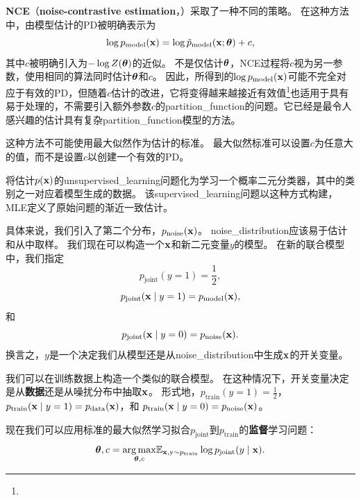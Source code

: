\textbf{\gls{NCE}}（\textbf{noise-contrastive estimation}，）\citep{Gutmann+Hyvarinen-2010}采取了一种不同的策略。
 在这种方法中，由模型估计的\gls{PD}被明确表示为
\begin{equation}
	\log p_{\text{model}} (\mathbf{x}) = \log \tilde{p}_{\text{model}} (\mathbf{x}; \boldsymbol{\theta}) + c,
\end{equation}
其中$c$被明确引入为$-\log Z(\boldsymbol{\theta})$的近似。
不是仅估计$\boldsymbol{\theta}$，\gls{NCE}过程将$c$视为另一参数，使用相同的算法同时估计$\boldsymbol{\theta}$和$c$。
因此，所得到的$\log p_{\text{model}}(\mathbf{x})$可能不完全对应于有效的\gls{PD}，但随着$c$估计的改进，它将变得越来越接近有效值\footnote{}也适用于具有易于处理的，不需要引入额外参数$c$的\gls{partition_function}的问题。它已经是最令人感兴趣的估计具有复杂\gls{partition_function}模型的方法。


这种方法不可能使用最大似然作为估计的标准。
最大似然标准可以设置$c$为任意大的值，而不是设置$c$以创建一个有效的\gls{PD}。


将估计$p(\mathbf{x})$的\gls{unsupervised_learning}问题化为学习一个概率二元分类器，其中的类别之一对应着模型生成的数据。
该\gls{supervised_learning}问题以这种方式构建，\gls{MLE}定义了原始问题的渐近一致估计。


具体来说，我们引入了第二个分布，$p_{\text{noise}}(\mathbf{x})$。
\gls{noise_distribution}应该易于估计和从中取样。
我们现在可以构造一个$\mathbf{x}$和新二元变量$y$的模型。
在新的联合模型中，我们指定
\begin{equation}
	p_{\text{joint}} (y = 1) = \frac{1}{2},
\end{equation}
\begin{equation}
	p_{\text{joint}} (\mathbf{x} \mid y = 1) = p_{\text{model}} (\mathbf{x}),
\end{equation}
和
\begin{equation}
	p_{\text{joint}} (\mathbf{x} \mid y = 0) = p_{\text{noise}}(\mathbf{x}).
\end{equation}
换言之，$y$是一个决定我们从模型还是从\gls{noise_distribution}中生成$\mathbf{x}$的开关变量。


我们可以在训练数据上构造一个类似的联合模型。
在这种情况下，开关变量决定是从\textbf{数据}还是从噪扰分布中抽取$\mathbf{x}$。
形式地，$p_{\text{train}}(y = 1) = \frac{1}{2}$，$p_{\text{train}}( \mathbf{x} \mid y = 1) = p_{\text{data}}( \mathbf{x})$，和
$p_{\text{train}}(\mathbf{x} \mid y = 0) = p_{\text{noise}}(\mathbf{x})$。


现在我们可以应用标准的最大似然学习拟合$p_{\text{joint}}$到$p_{\text{train}}$的\textbf{监督}学习问题：
\begin{equation}
	\boldsymbol{\theta}, c = \underset{ \boldsymbol{\theta}, c}{\arg\max} \mathbb{E}_{\mathbf{x}, \mathrm{y} \sim p_{\text{train}}} \log 
	p_{\text{joint}} (y \mid \mathbf{x}).
\end{equation}


